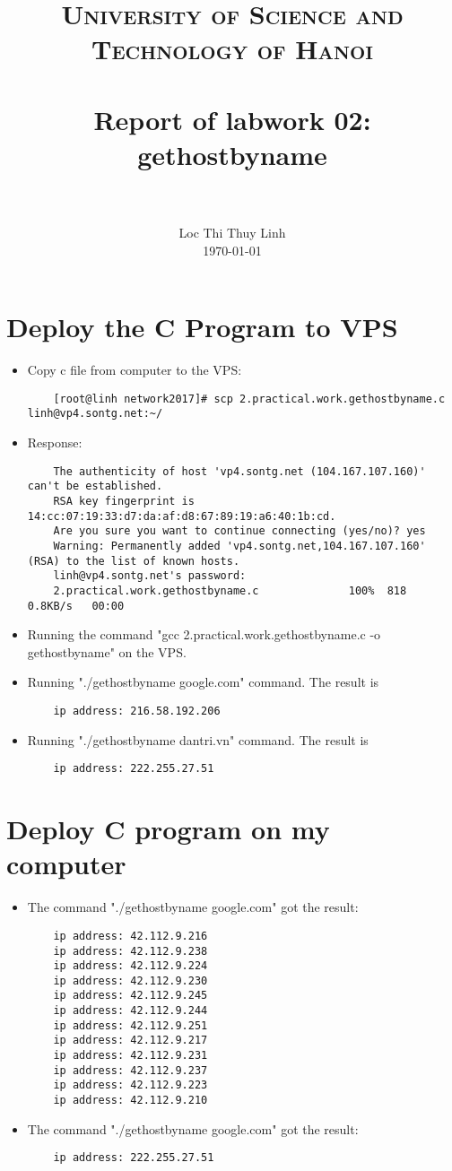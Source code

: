 \documentclass[paper=a4, fontsize=11pt]{scrartcl}
\title{
		\usefont{OT1}{bch}{b}{n}
		\normalfont \normalsize \textsc{University of Science and Technology of Hanoi} \\ [25pt]
		\horrule{0.5pt} \\[0.4cm]
		\huge Report of labwork 02: gethostbyname \\
		\horrule{2pt} \\[0.5cm]
}
\author{
		\normalfont 								\normalsize
        Loc Thi Thuy Linh\\[-3pt]		\normalsize
        \today
}
\date{}
\numberwithin{equation}{section}		%
\numberwithin{figure}{section}			%
\numberwithin{table}{section}				%
\begin{document}
\maketitle
\section{Deploy the C Program to VPS}

\begin{itemize}
 \item Copy c file from computer to the VPS:
 \begin{lstlisting}
 	[root@linh network2017]# scp 2.practical.work.gethostbyname.c linh@vp4.sontg.net:~/
 \end{lstlisting}
 \item Response: 
 \begin{lstlisting}
	The authenticity of host 'vp4.sontg.net (104.167.107.160)' can't be established.
	RSA key fingerprint is 14:cc:07:19:33:d7:da:af:d8:67:89:19:a6:40:1b:cd.
	Are you sure you want to continue connecting (yes/no)? yes
	Warning: Permanently added 'vp4.sontg.net,104.167.107.160' (RSA) to the list of known hosts.
	linh@vp4.sontg.net's password: 
	2.practical.work.gethostbyname.c              100%  818     0.8KB/s   00:00 
\end{lstlisting}

\item Running the command "gcc 2.practical.work.gethostbyname.c -o gethostbyname" on the VPS.
\item Running "./gethostbyname google.com" command. The result is
\begin{lstlisting}
	ip address: 216.58.192.206
\end{lstlisting}
\item Running "./gethostbyname dantri.vn" command. The result is
\begin{lstlisting}
	ip address: 222.255.27.51
\end{lstlisting}
\end{itemize}

\section{Deploy C program on my computer}
\begin{itemize}
 \item The command "./gethostbyname google.com" got the result:
 \begin{lstlisting}
	ip address: 42.112.9.216
	ip address: 42.112.9.238
	ip address: 42.112.9.224
	ip address: 42.112.9.230
	ip address: 42.112.9.245
	ip address: 42.112.9.244
	ip address: 42.112.9.251
	ip address: 42.112.9.217
	ip address: 42.112.9.231
	ip address: 42.112.9.237
	ip address: 42.112.9.223
	ip address: 42.112.9.210
\end{lstlisting}
 
 \item The command "./gethostbyname google.com" got the result:
 \begin{lstlisting}
 	ip address: 222.255.27.51
\end{lstlisting}
\end{itemize}
\end{document}
